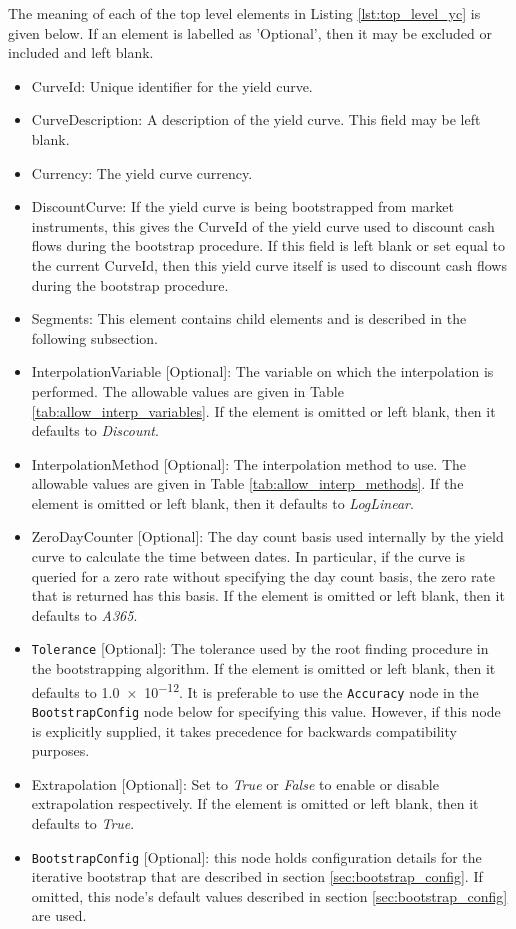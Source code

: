 The meaning of each of the top level elements in Listing \ref{lst:top_level_yc} is given below. If an element is labelled 
as 'Optional', then it may be excluded or included and left blank.
\begin{itemize}
\item CurveId: Unique identifier for the yield curve.
\item CurveDescription: A description of the yield curve. This field may be left blank.
\item Currency: The yield curve currency.
\item DiscountCurve: If the yield curve is being bootstrapped from market instruments, this gives the CurveId of the
yield curve used to discount cash flows during the bootstrap procedure. If this field is left blank or set equal to the
current CurveId, then this yield curve itself is used to discount cash flows during the bootstrap procedure.
\item Segments: This element contains child elements and is described in the following subsection.
\item InterpolationVariable [Optional]: The variable on which the interpolation is performed. The allowable values are
given in Table \ref{tab:allow_interp_variables}. If the element is omitted or left blank, then it defaults to
\emph{Discount}.
\item InterpolationMethod [Optional]: The interpolation method to use. The allowable values are given in Table
\ref{tab:allow_interp_methods}. If the element is omitted or left blank, then it defaults to \emph{LogLinear}.
\item ZeroDayCounter [Optional]: The day count basis used internally by the yield curve to calculate the time between
dates. In particular, if the curve is queried for a zero rate without specifying the day count basis, the zero rate that
is returned has this basis. If the element is omitted or left blank, then it defaults to \emph{A365}.

\item \lstinline!Tolerance! [Optional]: The tolerance used by the root finding procedure in the bootstrapping algorithm. If the
element is omitted or left blank, then it defaults to \num[scientific-notation=true]{1.0e-12}. It is preferable to use the 
\lstinline!Accuracy! node in the \lstinline!BootstrapConfig! node below for specifying this value. However, if this node is 
explicitly supplied, it takes precedence for backwards compatibility purposes.

\item Extrapolation [Optional]: Set to \emph{True} or \emph{False} to enable or disable extrapolation respectively. If
the element is omitted or left blank, then it defaults to \emph{True}.

\item \lstinline!BootstrapConfig! [Optional]: this node holds configuration details for the iterative bootstrap 
that are described in section \ref{sec:bootstrap_config}. If omitted, this node's default values described 
in section \ref{sec:bootstrap_config} are used.

\end{itemize}

